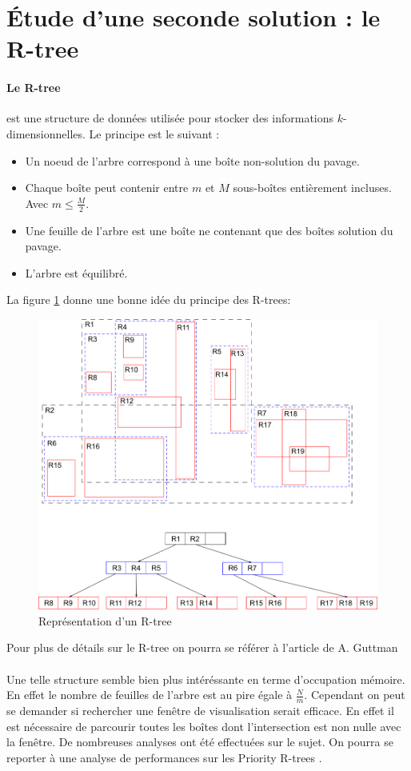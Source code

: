 \section{\'Etude d'une seconde solution : le R-tree}
\paragraph{Le R-tree} est une structure de données utilisée pour stocker des informations $k$-dimensionnelles. Le principe est le suivant :
\begin{itemize}
 \item Un noeud de l'arbre correspond à une boîte non-solution du pavage.
 \item Chaque boîte peut contenir entre $m$ et $M$ sous-boîtes entièrement incluses. Avec $m\leq \frac{M}{2}$.
 \item Une feuille de l'arbre est une boîte ne contenant que des boîtes solution du pavage.
 \item L'arbre est équilibré.
\end{itemize}

La figure \ref{fig:rtree} donne une bonne idée du principe des R-trees\cite{wiki}:
\begin{figure}[htbp]
\centering
\includegraphics[scale=0.50]{rtree}
\caption{Représentation d'un R-tree}
\label{fig:rtree}
\end{figure}

Pour plus de détails sur le R-tree on pourra se référer à l'article de A. Guttman \cite{Guttman}

\paragraph{} Une telle structure semble bien plus intéréssante en terme d'occupation mémoire. En effet le nombre de feuilles de l'arbre est au pire égale à $\frac{N}{m}$. Cependant on peut se demander si rechercher une fenêtre de visualisation serait efficace. En effet il est nécessaire de parcourir toutes les boîtes dont l'intersection est non nulle avec la fenêtre. De nombreuses analyses ont été effectuées sur le sujet. On pourra se reporter à une analyse de performances sur les Priority R-trees \cite{PRTree}.

